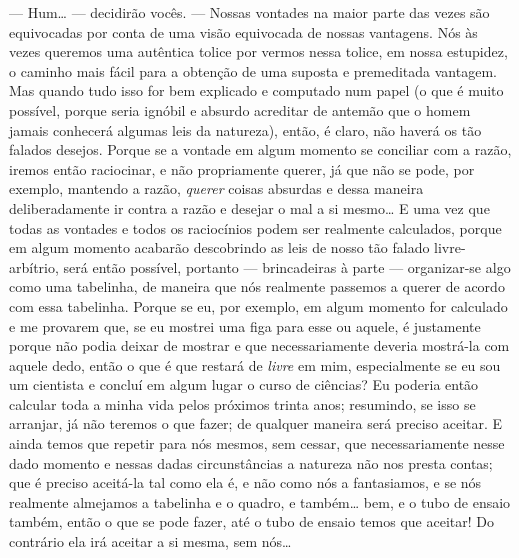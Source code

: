 --- Hum\ldots{} --- decidirão vocês. --- Nossas vontades na maior parte das vezes
são equivocadas por conta de uma visão equivocada de nossas vantagens.
Nós às vezes queremos uma autêntica tolice por vermos nessa tolice, em
nossa estupidez, o caminho mais fácil para a obtenção de uma suposta e
premeditada vantagem. Mas quando tudo isso for bem explicado e
computado num papel (o que é muito possível, porque seria ignóbil e
absurdo acreditar de antemão que o homem jamais conhecerá algumas leis
da natureza), então, é claro, não haverá os tão falados desejos. Porque
se a vontade em algum momento se conciliar com a razão, iremos então
raciocinar, e não propriamente querer, já que não se pode, por exemplo,
mantendo a razão, \textit{querer} coisas absurdas e dessa maneira
deliberadamente ir contra a razão e desejar o mal a si mesmo\ldots{} E uma
vez que todas as vontades e todos os raciocínios podem ser realmente
calculados, porque em algum momento acabarão descobrindo as leis de
nosso tão falado livre-arbítrio, será então possível, portanto ---
brincadeiras à parte --- organizar-se algo como uma tabelinha, de maneira
que nós realmente passemos a querer de acordo com essa tabelinha.
Porque se eu, por exemplo, em algum momento for calculado e me provarem
que, se eu mostrei uma figa para esse ou aquele, é justamente porque
não podia deixar de mostrar e que necessariamente deveria mostrá-la com
aquele dedo, então o que é que restará de \textit{livre} em mim,
especialmente se eu sou um cientista e concluí em algum lugar o curso
de ciências? Eu poderia então calcular toda a minha vida pelos próximos
trinta anos; resumindo, se isso se arranjar, já não teremos o que
fazer; de qualquer maneira será preciso aceitar. E ainda temos que
repetir para nós mesmos, sem cessar, que necessariamente nesse dado
momento e nessas dadas circunstâncias a natureza não nos presta contas;
que é preciso aceitá-la tal como ela é, e não como nós a fantasiamos, e
se nós realmente almejamos a tabelinha e o quadro, e também\ldots{} bem, e o
tubo de ensaio também, então o que se pode fazer, até o tubo de ensaio
temos que aceitar! Do contrário ela irá aceitar a si mesma, sem nós\ldots{}

